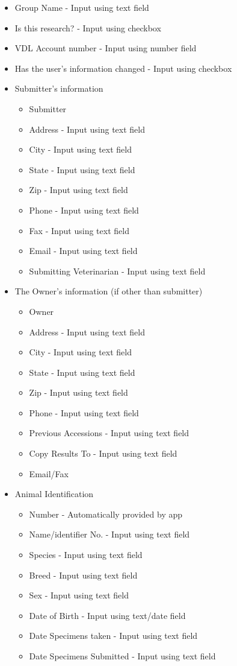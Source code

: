\documentclass[onecolumn, draftclsnofoot,10pt, compsoc]{IEEEtran}
\begin{document}
\begin{itemize}
\item Group Name - Input using text field
\item Is this research? - Input using checkbox
\item VDL Account number - Input using number field
\item Has the user's information changed - Input using checkbox
\item Submitter's information

\begin{itemize}
\item Submitter 
\item Address - Input using text field
\item City - Input using text field
\item State - Input using text field
\item Zip - Input using text field
\item Phone - Input using text field
\item Fax - Input using text field
\item Email - Input using text field
\item Submitting Veterinarian - Input using text field
\end{itemize}


\item The Owner's information (if other than submitter)
\begin{itemize}
\item Owner 
\item Address - Input using text field
\item City - Input using text field
\item State - Input using text field
\item Zip - Input using text field
\item Phone - Input using text field
\item Previous Accessions - Input using text field
\item Copy Results To - Input using text field
\item Email/Fax 
\end{itemize}


\item Animal Identification
    \begin{itemize}
    \item Number - Automatically provided by app
    \item Name/identifier No. - Input using text field
    \item Species - Input using text field
    \item Breed - Input using text field
    \item Sex - Input using text field
    \item Date of Birth - Input using text/date field
	\item Date Specimens taken - Input using text field
    \item Date Specimens Submitted - Input using text field
    

\end{itemize}
\end{itemize}
\end{document}
